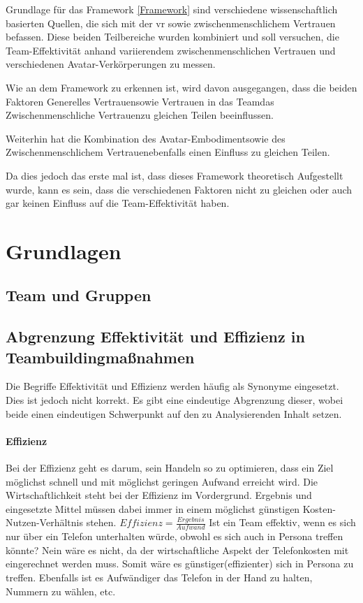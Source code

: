 \documentclass[a4paper,11pt]{article}%
\renewcommand{\\}{\vspace*{0.5\baselineskip} \newline}
\begin{document}
Grundlage für das Framework \autoref{Framework} sind verschiedene wissenschaftlich basierten Quellen, die sich mit der \ac{vr} sowie zwischenmenschlichem Vertrauen befassen. Diese beiden Teilbereiche wurden kombiniert und soll versuchen, die Team-Effektivität anhand variierendem zwischenmenschlichen Vertrauen und verschiedenen Avatar-Verkörperungen zu messen.

Wie an dem Framework zu erkennen ist, wird davon ausgegangen, dass die beiden Faktoren \flqq Generelles Vertrauen\frqq sowie \flqq Vertrauen in das Team\frqq das \flqq Zwischenmenschliche Vertrauen\frqq zu gleichen Teilen beeinflussen. 

Weiterhin hat die Kombination des \flqq Avatar-Embodiment\frqq sowie des \flqq Zwischenmenschlichem Vertrauen\frqq ebenfalls einen Einfluss zu gleichen Teilen.

Da dies jedoch das erste mal ist, dass dieses Framework theoretisch Aufgestellt wurde, kann es sein, dass die verschiedenen Faktoren nicht zu gleichen oder auch gar keinen Einfluss auf die Team-Effektivität haben.

	\newpage
\section{Grundlagen}

\subsection{Team und Gruppen}

\subsection{Abgrenzung Effektivität und Effizienz in Teambuildingmaßnahmen}
Die Begriffe Effektivität und Effizienz werden häufig als Synonyme eingesetzt. Dies ist jedoch nicht korrekt. Es gibt eine eindeutige Abgrenzung dieser, wobei beide einen eindeutigen Schwerpunkt auf den zu Analysierenden Inhalt setzen.

\paragraph{Effizienz}
Bei der Effizienz geht es darum, sein Handeln so zu optimieren, dass ein Ziel möglichst schnell und mit möglichst geringen Aufwand erreicht wird. Die Wirtschaftlichkeit steht bei der Effizienz im Vordergrund. Ergebnis und eingesetzte Mittel müssen dabei immer in einem möglichst günstigen Kosten-Nutzen-Verhältnis stehen.\\
$Effizienz = \frac{Ergebnis}{Aufwand}$ \\
Ist ein Team effektiv, wenn es sich nur über ein Telefon unterhalten würde, obwohl es sich auch in Persona treffen könnte?
Nein wäre es nicht, da der wirtschaftliche Aspekt der Telefonkosten mit eingerechnet werden muss. Somit wäre es günstiger(effizienter) sich in Persona zu treffen. Ebenfalls ist es Aufwändiger das Telefon in der Hand zu halten, Nummern zu wählen, etc.
\end{document}
